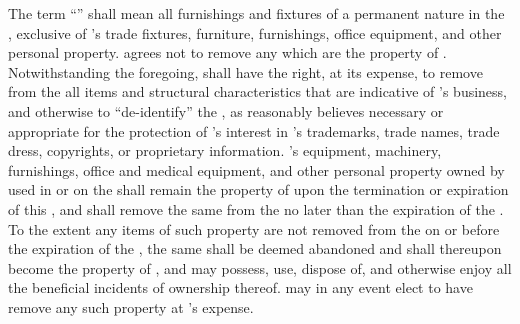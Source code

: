 The term ``'' shall mean all furnishings and fixtures of a permanent nature in the \premises, exclusive of \lessee's trade fixtures, furniture, furnishings, office equipment, and other personal property. \lessee agrees not to remove any \improvements which are the property of \lessor. Notwithstanding the foregoing, \lessee shall have the right, at its expense, to remove from the \premises all items and structural characteristics that are indicative of \lessee's business, and otherwise to ``de-identify'' the \premises, as \lessor reasonably believes necessary or appropriate for the protection of \lessee's interest in \lessee's trademarks, trade names, trade dress, copyrights, or proprietary information. \lessee's equipment, machinery, furnishings, office and medical equipment, and other personal property owned by \lessee used in or on the \premises shall remain the property of \lessee upon the termination or expiration of this \lease, and \lessee shall remove the same from the \premises no later than the expiration of the \termOfLease. To the extent any items of such property are not removed from the \premises on or before the expiration of the \termOfLease, the same shall be deemed abandoned and shall thereupon become the property of \lessor, and \lessor may possess, use, dispose of, and otherwise enjoy all the beneficial incidents of ownership thereof. \lessor may in any event elect to have \lessee remove any such property at \lessee's expense.
